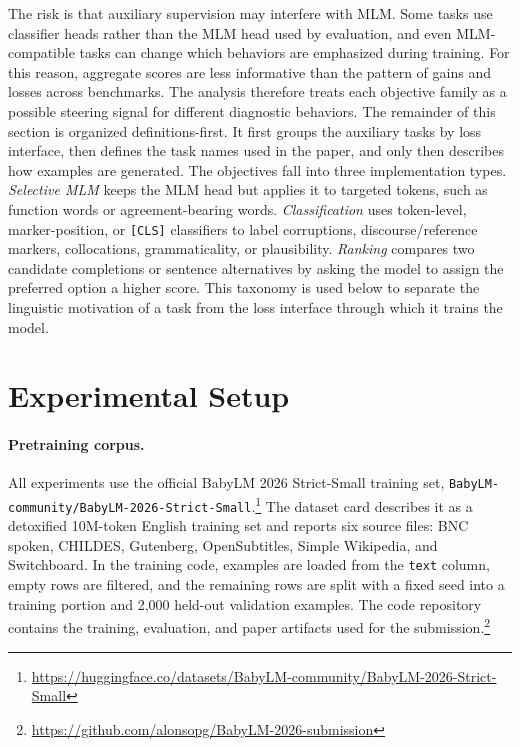 \documentclass[11pt]{article}
\begin{document}
The risk is that auxiliary supervision may interfere with MLM.
Some tasks use classifier heads rather than the MLM head used by evaluation, and even MLM-compatible tasks can change which behaviors are emphasized during training.
For this reason, aggregate scores are less informative than the pattern of gains and losses across benchmarks.
The analysis therefore treats each objective family as a possible steering signal for different diagnostic behaviors.
The remainder of this section is organized definitions-first.
It first groups the auxiliary tasks by loss interface, then defines the task names used in the paper, and only then describes how examples are generated.
The objectives fall into three implementation types.
\textit{Selective MLM} keeps the MLM head but applies it to targeted tokens, such as function words or agreement-bearing words.
\textit{Classification} uses token-level, marker-position, or \texttt{[CLS]} classifiers to label corruptions, discourse/reference markers, collocations, grammaticality, or plausibility.
\textit{Ranking} compares two candidate completions or sentence alternatives by asking the model to assign the preferred option a higher score.
This taxonomy is used below to separate the linguistic motivation of a task from the loss interface through which it trains the model.

\section{Experimental Setup}
\label{sec:experimental-setup}

\paragraph{Pretraining corpus.}
All experiments use the official BabyLM 2026 Strict-Small training set, \texttt{BabyLM-community/}\allowbreak\texttt{BabyLM-2026-Strict-Small}.\footnote{\url{https://huggingface.co/datasets/BabyLM-community/BabyLM-2026-Strict-Small}}
The dataset card describes it as a detoxified 10M-token English training set and reports six source files: BNC spoken, CHILDES, Gutenberg, OpenSubtitles, Simple Wikipedia, and Switchboard.
In the training code, examples are loaded from the \texttt{text} column, empty rows are filtered, and the remaining rows are split with a fixed seed into a training portion and 2,000 held-out validation examples.
The code repository contains the training, evaluation, and paper artifacts used for the submission.\footnote{\url{https://github.com/alonsopg/BabyLM-2026-submission}}
\end{document}
